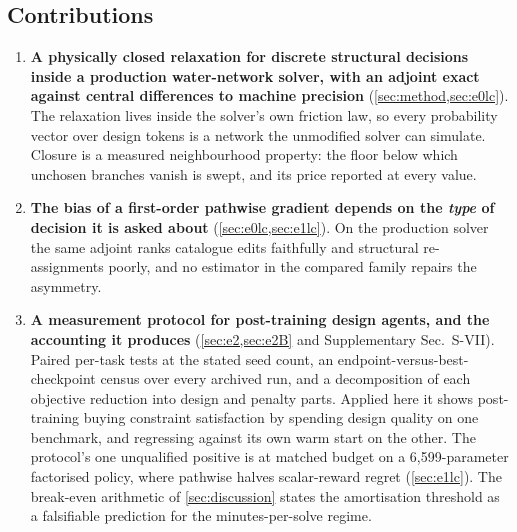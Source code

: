 \subsection{Contributions}
\label{sec:contributions}

\begin{enumerate}

\item \textbf{A physically closed relaxation for discrete structural decisions
  inside a production water-network solver, with an adjoint exact against
  central differences to machine precision}
  (\cref{sec:method,sec:e0lc}).  The relaxation lives inside the solver's own
  friction law, so every probability vector over design tokens is a network the
  unmodified solver can simulate.  Closure is a measured neighbourhood property:
  the floor below which unchosen branches vanish is swept, and its price
  reported at every value.

\item \textbf{The bias of a first-order pathwise gradient depends on the
  \emph{type} of decision it is asked about} (\cref{sec:e0lc,sec:e1lc}).  On
  the production solver the same adjoint ranks catalogue edits faithfully and
  structural re-assignments poorly, and no estimator in the compared family
  repairs the asymmetry.

\item \textbf{A measurement protocol for post-training design agents, and the
  accounting it produces} (\cref{sec:e2,sec:e2B} and Supplementary Sec.~S-VII).  Paired per-task
  tests at the stated seed count, an endpoint-versus-best-checkpoint census over
  every archived run, and a decomposition of each objective reduction into
  design and penalty parts.  Applied here it shows post-training buying
  constraint satisfaction by spending design quality on one benchmark, and
  regressing against its own warm start on the other.  The protocol's one
  unqualified positive is at matched budget on a 6{,}599-parameter factorised
  policy, where pathwise halves scalar-reward regret (\cref{sec:e1lc}).
  The break-even arithmetic of \cref{sec:discussion} states the amortisation
  threshold as a falsifiable prediction for the minutes-per-solve regime.


\end{enumerate}
